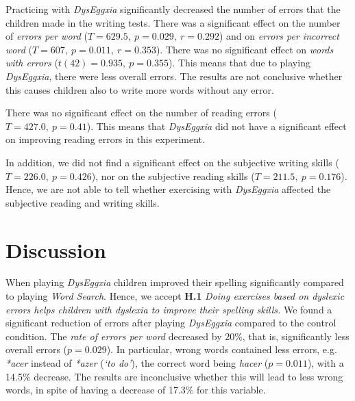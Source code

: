 \documentclass[letterpaper]{sig-alternate-2013}
\begin{document}
Practicing with {\it DysEggxia} significantly decreased the number of errors that the children made in the writing tests.
There was a significant effect on the number of \emph{errors per word} ($T = 629.5,~p = 0.029,~r = 0.292$) 
and on \emph{errors per incorrect word} ($T = 607,~p = 0.011,~r = 0.353$). There was no significant effect on \emph{words with errors} ($t(42) = 0.935,~p = 0.355$). This means that due to playing {\it DysEggxia}, there were less overall errors. The results are not conclusive whether this causes children also to write more words without any error.

There was no significant effect on the number of reading errors ($T = 427.0,~p = 0.41$). 
This means that {\it DysEggxia} did not have a significant effect on improving reading errors in this experiment.

In addition, we did not find a significant effect on the subjective writing skills ($T = 226.0,~p = 0.426$), nor on the subjective reading skills ($T = 211.5,~p = 0.176$). 
Hence, we are not able to tell whether exercising with {\it DysEggxia} affected the subjective reading and writing skills.


\section{Discussion}
When playing {\it DysEggxia} children improved their spelling significantly compared to playing {\it Word Search}. Hence, we accept {\bf H.1} {\it Doing exercises based on dyslexic errors helps children with dyslexia to improve their spelling skills.} We found a significant reduction of errors after playing {\it DysEggxia} compared to the control condition. The  \emph{rate of errors per word} decreased by 20\%, that is, significantly less overall errors ($p=0.029$). In particular, wrong words contained less errors, e.g. \emph{*acer} instead of \emph{*azer} ({\it `to do'}), the correct word being \emph{hacer} ($p=0.011$), with a 14.5\% decrease. The results are inconclusive whether this will lead to less wrong words, in spite of having a decrease of 17.3\% for this variable. 
\end{document}
